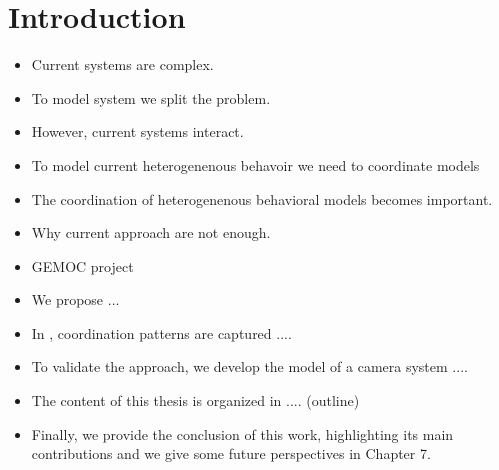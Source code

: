 \chapter{Introduction}


\begin{itemize}
	\item Current systems are complex.
	\item To model system we split the problem.
	\item However, current systems interact.
	\item To model current heterogenenous behavoir we need to coordinate models
	\item The coordination of heterogenenous behavioral models becomes important.
	
	\item Why current approach are not enough.
	\item GEMOC project
	
	\item We propose \bcool ...  
	
	\item In \bcool, coordination patterns are captured .... 
	
	\item To validate the approach, we develop the model of a camera system ....
	
	\item The content of this thesis is organized in .... (outline)
	
	\item Finally, we provide the conclusion of this work, highlighting its main contributions and
	we give some future perspectives in Chapter 7.
	
\end{itemize}




